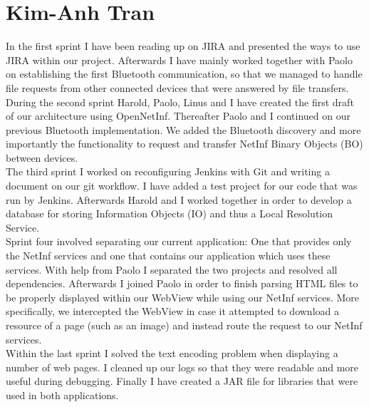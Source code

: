 \section{Kim-Anh Tran}

In the first sprint I have been reading up on JIRA and presented the ways to use
JIRA within our project. Afterwards I have mainly worked together with Paolo on establishing
the first Bluetooth communication, so that we managed to handle file requests from other connected
devices that were answered by file transfers.\\

During the second sprint Harold, Paolo, Linus and I have created the first draft of our architecture using OpenNetInf. Thereafter Paolo and I continued on our previous Bluetooth implementation. We added
the Bluetooth discovery and more importantly the functionality to request and
transfer NetInf Binary Objects (BO) between devices.\\

The third sprint I worked on reconfiguring Jenkins with Git and writing a document on
our git workflow. I have added a test project for our code that was run by Jenkins.
Afterwards Harold and I worked together in order to develop a database for storing
Information Objects (IO) and thus a Local Resolution Service.\\

Sprint four involved separating our current application: One that provides
only the NetInf services and one that contains our application which uses
these services. With help from Paolo I separated the two projects and resolved
all dependencies. Afterwards I joined Paolo in order to finish parsing HTML files
to be properly displayed within our WebView while using our NetInf services.
More specifically, we intercepted the WebView in case it attempted to
download a resource of a page (such as an image) and instead route the 
request to our NetInf services.\\

Within the last sprint I solved the text encoding problem when displaying 
a number of web pages. I cleaned up our logs so that they were readable and
more useful during debugging. Finally I have created a JAR file for
libraries that were used in both applications.\\

